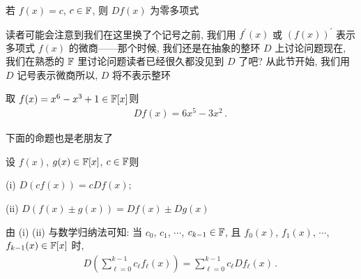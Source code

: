 \begin{remark}
    若 $f(x) = c$, $c \in \mathbb{F}$, 则 $Df(x)$ 为零多项式\period
\end{remark}

\begin{remark}
    读者可能会注意到我们在这里换了个记号\period 之前, 我们用 $f^{\prime} (x)$ 或 $(f(x))^{\prime}$ 表示多项式 $f(x)$ 的微商——那个时候, 我们还是在抽象的整环 $D$ 上讨论问题\period 现在, 我们在熟悉的 $\mathbb{F}$ 里讨论问题\period 读者已经很久都没见到 $D$ 了吧? 从此节开始, 我们用 $D$ 记号表示微商\period 所以, $D$ 将不表示整环\period
\end{remark}

\begin{example}
    取 $f(x) = x^6 - x^3 + 1 \in \mathbb{F}[x]$\period 则
    \begin{align*}
        Df(x) = 6x^5 - 3x^2 \period
    \end{align*}
\end{example}

下面的命题也是老朋友了\period

\begin{proposition}
    设 $f(x)$, $g(x) \in \mathbb{F}[x]$, $c \in \mathbb{F}$\period 则

    (i) $D(cf(x)) = c Df(x)$;

    (ii) $D(f(x) \pm g(x)) = Df(x) \pm Dg(x)$\period

    由 (i) (ii) 与数学归纳法可知: 当 $c_0$, $c_1$, $\cdots$, $c_{k-1} \in \mathbb{F}$, 且 $f_0 (x)$, $f_1 (x)$, $\cdots$, $f_{k-1} (x) \in \mathbb{F}[x]$ 时,
    \begin{align*}
        D \left( \sum_{\ell = 0}^{k-1} c_\ell f_\ell (x) \right) = \sum_{\ell = 0}^{k-1} c_\ell Df_\ell (x) \period
    \end{align*}
\end{proposition}

